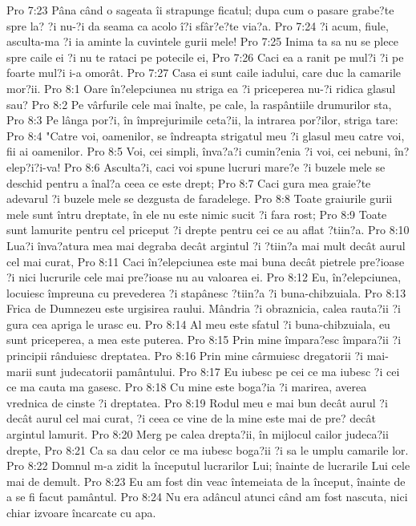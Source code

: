 Pro 7:23  Pâna când o sageata îi strapunge ficatul; dupa cum o pasare grabe?te spre la? ?i nu-?i da seama ca acolo î?i sfâr?e?te via?a.
Pro 7:24  ?i acum, fiule, asculta-ma ?i ia aminte la cuvintele gurii mele!
Pro 7:25  Inima ta sa nu se plece spre caile ei ?i nu te rataci pe potecile ei,
Pro 7:26  Caci ea a ranit pe mul?i ?i pe foarte mul?i i-a omorât.
Pro 7:27  Casa ei sunt caile iadului, care duc la camarile mor?ii.
Pro 8:1  Oare în?elepciunea nu striga ea ?i priceperea nu-?i ridica glasul sau?
Pro 8:2  Pe vârfurile cele mai înalte, pe cale, la raspântiile drumurilor sta,
Pro 8:3  Pe lânga por?i, în împrejurimile ceta?ii, la intrarea por?ilor, striga tare:
Pro 8:4  "Catre voi, oamenilor, se îndreapta strigatul meu ?i glasul meu catre voi, fii ai oamenilor.
Pro 8:5  Voi, cei simpli, înva?a?i cumin?enia ?i voi, cei nebuni, în?elep?i?i-va!
Pro 8:6  Asculta?i, caci voi spune lucruri mare?e ?i buzele mele se deschid pentru a înal?a ceea ce este drept;
Pro 8:7  Caci gura mea graie?te adevarul ?i buzele mele se dezgusta de faradelege.
Pro 8:8  Toate graiurile gurii mele sunt întru dreptate, în ele nu este nimic sucit ?i fara rost;
Pro 8:9  Toate sunt lamurite pentru cel priceput ?i drepte pentru cei ce au aflat ?tiin?a.
Pro 8:10  Lua?i înva?atura mea mai degraba decât argintul ?i ?tiin?a mai mult decât aurul cel mai curat,
Pro 8:11  Caci în?elepciunea este mai buna decât pietrele pre?ioase ?i nici lucrurile cele mai pre?ioase nu au valoarea ei.
Pro 8:12  Eu, în?elepciunea, locuiesc împreuna cu prevederea ?i stapânesc ?tiin?a ?i buna-chibzuiala.
Pro 8:13  Frica de Dumnezeu este urgisirea raului. Mândria ?i obraznicia, calea rauta?ii ?i gura cea apriga le urasc eu.
Pro 8:14  Al meu este sfatul ?i buna-chibzuiala, eu sunt priceperea, a mea este puterea.
Pro 8:15  Prin mine împara?esc împara?ii ?i principii rânduiesc dreptatea.
Pro 8:16  Prin mine cârmuiesc dregatorii ?i mai-marii sunt judecatorii pamântului.
Pro 8:17  Eu iubesc pe cei ce ma iubesc ?i cei ce ma cauta ma gasesc.
Pro 8:18  Cu mine este boga?ia ?i marirea, averea vrednica de cinste ?i dreptatea.
Pro 8:19  Rodul meu e mai bun decât aurul ?i decât aurul cel mai curat, ?i ceea ce vine de la mine este mai de pre? decât argintul lamurit.
Pro 8:20  Merg pe calea drepta?ii, în mijlocul cailor judeca?ii drepte,
Pro 8:21  Ca sa dau celor ce ma iubesc boga?ii ?i sa le umplu camarile lor.
Pro 8:22  Domnul m-a zidit la începutul lucrarilor Lui; înainte de lucrarile Lui cele mai de demult.
Pro 8:23  Eu am fost din veac întemeiata de la început, înainte de a se fi facut pamântul.
Pro 8:24  Nu era adâncul atunci când am fost nascuta, nici chiar izvoare încarcate cu apa.
